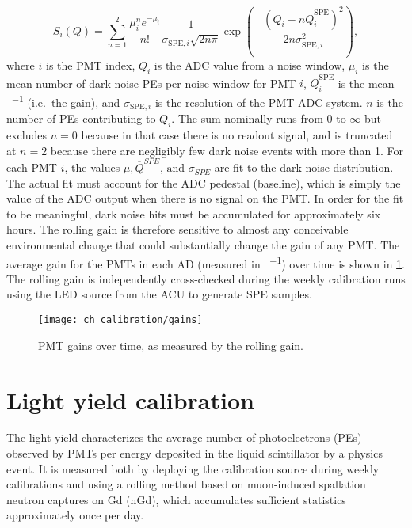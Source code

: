 \begin{equation}
    S_i(Q) = \sum_{n=1}^2 \frac{\mu_i^n e^{-\mu_i}}{n!}
    \frac{1}{\sigma_{\text{SPE},i}\sqrt{2n\pi}}
    \exp
    \left(
        -\frac{(Q_i-n\overline{Q}_i^{\text{SPE}})^2}{2n\sigma^2_{\text{SPE},i}}
    \right),
\end{equation}
where $i$ is the PMT index,
$Q_i$ is the ADC value from a noise window,
$\mu_i$ is the mean number of dark noise PEs per noise window for PMT $i$,
$\overline{Q}_i^{\text{SPE}}$ is the mean \si{\adc\per\pe} (i.e.\ the gain),
and $\sigma_{\text{SPE},i}$ is the resolution of the PMT-ADC system.
$n$ is the number of PEs contributing to $Q_i$.
The sum nominally runs from $0$ to $\infty$ but
excludes $n=0$ because in that case there is no readout signal,
and is truncated at $n=2$ because there are negligibly few dark noise events
with more than \SI{1}{\pe}.
For each PMT $i$, the values $\mu,\overline{Q}^{SPE}\text{, and }\sigma_{SPE}$ are fit
to the dark noise distribution.
The actual fit must account for the ADC pedestal (baseline),
which is simply the value of the ADC output when there is no signal on the PMT.
In order for the fit to be meaningful, dark noise hits must be accumulated
for approximately six hours.
The rolling gain is therefore sensitive to almost any conceivable
environmental change that could substantially change the gain of any PMT.
The average gain for the PMTs in each AD (measured in \si{\adc\per\pe})
over time is shown in \cref{fig:gain}.
The rolling gain is independently cross-checked during the weekly calibration runs
using the LED source from the ACU to generate SPE samples.

\begin{figure}
    \centering
    \texttt{[image: ch\_calibration/gains]}
    \caption{PMT gains over time, as measured by the rolling gain.}
    \label{fig:gain}
\end{figure}


\section{Light yield calibration}
\label{sec:light_yield_calib}

The light yield characterizes the average
number of photoelectrons (PEs) observed by PMTs
per energy deposited in the liquid scintillator
by a physics event.
It is measured both by deploying the  calibration source
during weekly calibrations
and using a rolling method based on muon-induced spallation neutron
captures on Gd (nGd), which accumulates sufficient statistics
approximately once per day.

